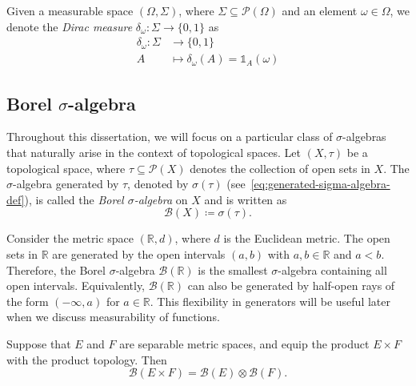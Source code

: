 \begin{definition}
    Given a measurable space $(\Omega, \Sigma)$, where $\Sigma \subseteq \mathcal{P}(\Omega)$ and an element $\omega \in \Omega$, we denote the \emph{Dirac measure} $\delta_{\omega}: \Sigma \to \{0, 1\}$ as
    \[
        \begin{aligned}
            \delta_{\omega}: \Sigma &\to \{0, 1\} \\
            A &\mapsto \delta_{\omega}(A) = \mathds{1}_A(\omega)
        \end{aligned}
    \]
\end{definition}

\subsection{Borel $\sigma$-algebra}

Throughout this dissertation, we will focus on a particular class of $\sigma$-algebras that naturally arise in the context of topological spaces. Let $(X, \tau)$ be a topological space, where $\tau \subseteq \mathcal{P}(X)$ denotes the collection of open sets in $X$. The $\sigma$-algebra generated by $\tau$, denoted by $\sigma(\tau)$ (see~\ref{eq:generated-sigma-algebra-def}), is called the \emph{Borel $\sigma$-algebra} on $X$ and is written as
\[
    \mathcal{B}(X) \coloneq \sigma(\tau).
\]

\begin{example}
    Consider the metric space $(\mathbb{R}, d)$, where $d$ is the Euclidean metric. The open sets in $\mathbb{R}$ are generated by the open intervals $(a, b)$ with $a, b \in \mathbb{R}$ and $a < b$. Therefore, the Borel $\sigma$-algebra $\mathcal{B}(\mathbb{R})$ is the smallest $\sigma$-algebra containing all open intervals. Equivalently, $\mathcal{B}(\mathbb{R})$ can also be generated by half-open rays of the form $(-\infty, a)$ for $a \in \mathbb{R}$. This flexibility in generators will be useful later when we discuss measurability of functions.
\end{example}

\begin{lemma}
    \label{lem:product-borel-sigma}
    Suppose that $E$ and $F$ are separable metric spaces, and equip the product $E \times F$ with the product topology. Then
    \[
        \mathcal{B}(E \times F) = \mathcal{B}(E) \otimes \mathcal{B}(F).
    \]
\end{lemma}

